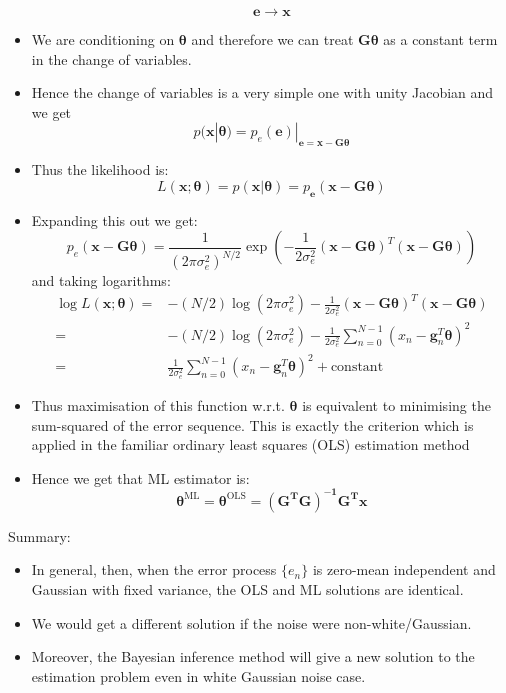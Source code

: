 \documentclass[12pt]{article}
\newcommand{\sigd}{\sigma^2}
\newcommand{\proc}[1]{\{ #1_n\}}
\newcommand{\OLS}{\textrm{OLS}}
\newcommand{\thetab}{\boldsymbol{\theta}}
\newcommand{\thetaols}{\thetab^\OLS}
\newcommand{\ml}{\textrm{ML}}
\begin{document}
\begin{itemize}
    \[
    \mathbf{e} \rightarrow \mathbf{x}
    \]
    \item We are conditioning on $\thetab$ and therefore we can treat $\mathbf{G\thetab}$ as a constant term in the change of variables.
    \item Hence the change of variables is a very simple one with unity Jacobian and we get
    \[
    p(\mathbf{x}|\thetab) = p_e(\mathbf{e})|_{\mathbf{e=x-G\thetab}}
    \]
    \item Thus the likelihood is:
    \[
    L(\mathbf{x;\thetab}) = p(\mathbf{x | \thetab}) = p_{\mathbf{e}}(\mathbf{x-G\thetab})
    \]
    \item Expanding this out we get:
    \[
    p_e(\mathbf{x-G\thetab}) = \frac{1}{(2\pi \sigd_e)^{N/2}}\exp\left(-\frac{1}{2\sigd_e}(\mathbf{x-G\thetab})^T(\mathbf{x-G\thetab}) \right)
    \]
    and taking logarithms:
    \begin{align*}
        \log L(\mathbf{x};\thetab) =& -(N/2)\log(2\pi \sigd_e) - \frac{1}{2\sigd_e}(\mathbf{x-G\thetab})^T(\mathbf{x-G\thetab}) \\
        =& -(N/2)\log(2\pi \sigd_e) - \frac{1}{2\sigd_e}\sum_{n=0}^{N-1}(x_n - \mathbf{g}_n^T \thetab)^2  \\
        =& \frac{1}{2\sigd_e}\sum_{n=0}^{N-1}(x_n - \mathbf{g}_n^T \thetab)^2 + \textrm{constant}
    \end{align*}
    \item Thus maximisation of this function w.r.t. $\thetab$ is equivalent to minimising the sum-squared of the error sequence. This is exactly the criterion which is applied in the familiar ordinary least squares (OLS) estimation method
    \item Hence we get that ML estimator is:
    \[
    \thetab^{\ml} = \thetaols = \mathbf{(G^TG)^{-1}G^Tx}
    \]
\end{itemize}
Summary:
\begin{itemize}
    \item In general, then, when the error process $\proc{e}$ is zero-mean independent and Gaussian with fixed variance, the OLS and ML solutions are identical.
    \item We would get a different solution if the noise were non-white/Gaussian. 
    \item Moreover, the Bayesian inference method will give a new solution to the estimation problem even in white Gaussian noise case.
\end{itemize}
\end{document}

